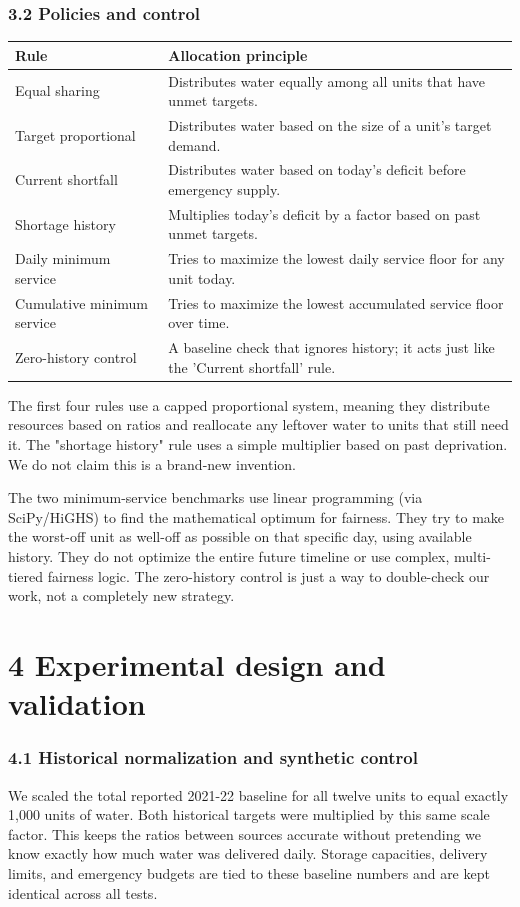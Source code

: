 \documentclass[conference]{IEEEtran}
\begin{document}
\subsubsection{3.2 Policies and control}
\begin{table}[t]
\centering
\begin{tabular}{ll}
\toprule
Rule & Allocation principle \\
\midrule
Equal sharing & Distributes water equally among all units that have unmet targets. \\
Target proportional & Distributes water based on the size of a unit's target demand. \\
Current shortfall & Distributes water based on today's deficit before emergency supply. \\
Shortage history & Multiplies today's deficit by a factor based on past unmet targets. \\
Daily minimum service & Tries to maximize the lowest daily service floor for any unit today. \\
Cumulative minimum service & Tries to maximize the lowest accumulated service floor over time. \\
Zero-history control & A baseline check that ignores history; it acts just like the 'Current shortfall' rule. \\
\bottomrule
\end{tabular}
\end{table}
The first four rules use a capped proportional system, meaning they distribute resources based on ratios and reallocate any leftover water to units that still need it. The "shortage history" rule uses a simple multiplier based on past deprivation. We do not claim this is a brand-new invention.

The two minimum-service benchmarks use linear programming (via SciPy/HiGHS) to find the mathematical optimum for fairness. They try to make the worst-off unit as well-off as possible on that specific day, using available history. They do not optimize the entire future timeline or use complex, multi-tiered fairness logic. The zero-history control is just a way to double-check our work, not a completely new strategy.

\section{4 Experimental design and validation}
\subsubsection{4.1 Historical normalization and synthetic control}
We scaled the total reported 2021-22 baseline for all twelve units to equal exactly 1,000 units of water. Both historical targets were multiplied by this same scale factor. This keeps the ratios between sources accurate without pretending we know exactly how much water was delivered daily. Storage capacities, delivery limits, and emergency budgets are tied to these baseline numbers and are kept identical across all tests.
\end{document}
